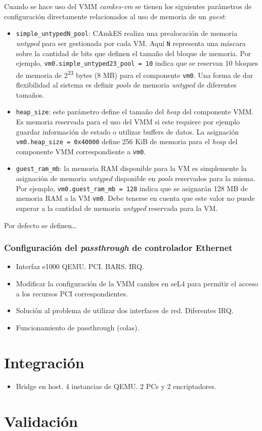 Cuando se hace uso del VMM \textit{camkes-vm} se tienen los siguientes parámetros de configuración directamente relacionados al uso de memoria de un \textit{guest}:
\begin{itemize}
    \item \texttt{simple\_untypedN\_pool}: CAmkES realiza una prealocación de memoria \textit{untyped} para ser gestionada por cada VM. Aquí \texttt{N} representa una máscara sobre la cantidad de bits que definen el tamaño del bloque de memoria. Por ejemplo, \texttt{vm0.simple\_untyped23\_pool = 10} indica que se reservan 10 bloques de memoria de 2\textsuperscript{23} bytes (8 MB) para el componente \texttt{vm0}. Una forma de dar flexibilidad al sistema es definir \textit{pools} de memoria \textit{untyped} de diferentes tamaños. 
    \item \texttt{heap\_size}: este parámetro define el tamaño del \textit{heap} del componente VMM. Es memoria reservada para el uso del VMM si este requiere por ejemplo guardar información de estado o utilizar buffers de datos. La asignación \texttt{vm0.heap\_size = 0x40000} define 256 KiB de memoria para el \textit{heap} del componente VMM correspondiente a \texttt{vm0}.
    \item \texttt{guest\_ram\_mb}: la memoria RAM disponible para la VM es simplemente la asignación de memoria \textit{untyped} disponible en \textit{pools} reservados para la misma. Por ejemplo, \texttt{vm0.guest\_ram\_mb = 128} indica que se asignarán 128 MB de memoria RAM a la VM \texttt{vm0}. Debe tenerse en cuenta que este valor no puede superar a la cantidad de memoria \textit{untyped} reservada para la VM.
\end{itemize}
Por defecto se definen\dots
{}


\subsubsection{Configuración del \textit{passthrough} de controlador Ethernet}



\begin{itemize}
    \item Interfaz e1000 QEMU. PCI. BARS. IRQ.
    \item Modificar la configuración de la VMM camkes en seL4 para permitir el acceso a los recursos PCI correspondientes.
    \item Solución al problema de utilizar dos interfaces de red. Diferentes IRQ.
    \item Funcionamiento de passthrough (colas).
\end{itemize}

\section{Integración}
\begin{itemize}
    \item Bridge en host. 4 instancias de QEMU. 2 PCs y 2 encriptadores.
\end{itemize}

\section{Validación} %
